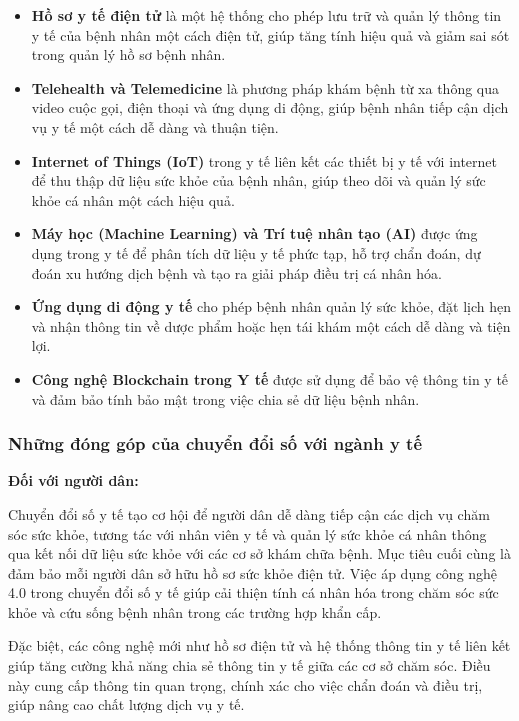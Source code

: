 \begin{itemize}
    \item \textbf{Hồ sơ y tế điện tử} là một hệ thống cho phép lưu trữ và quản lý thông tin y tế của bệnh nhân một cách điện tử, giúp tăng tính hiệu quả và giảm sai sót trong quản lý hồ sơ bệnh nhân.
    \item \textbf{Telehealth và Telemedicine} là phương pháp khám bệnh từ xa thông qua video cuộc gọi, điện thoại và ứng dụng di động, giúp bệnh nhân tiếp cận dịch vụ y tế một cách dễ dàng và thuận tiện.
    \item \textbf{Internet of Things (IoT)} trong y tế liên kết các thiết bị y tế với internet để thu thập dữ liệu sức khỏe của bệnh nhân, giúp theo dõi và quản lý sức khỏe cá nhân một cách hiệu quả.
    \item \textbf{Máy học (Machine Learning) và Trí tuệ nhân tạo (AI)} được ứng dụng trong y tế để phân tích dữ liệu y tế phức tạp, hỗ trợ chẩn đoán, dự đoán xu hướng dịch bệnh và tạo ra giải pháp điều trị cá nhân hóa.
    \item \textbf{Ứng dụng di động y tế} cho phép bệnh nhân quản lý sức khỏe, đặt lịch hẹn và nhận thông tin về dược phẩm hoặc hẹn tái khám một cách dễ dàng và tiện lợi.
    \item \textbf{Công nghệ Blockchain trong Y tế} được sử dụng để bảo vệ thông tin y tế và đảm bảo tính bảo mật trong việc chia sẻ dữ liệu bệnh nhân.
\end{itemize}

\subsubsection{Những đóng góp của chuyển đổi số với ngành y tế}
\textbf{Đối với người dân:}

Chuyển đổi số y tế tạo cơ hội để người dân dễ dàng tiếp cận các dịch vụ chăm sóc sức khỏe, tương tác với nhân viên y tế và quản lý sức khỏe cá nhân thông qua kết nối dữ liệu sức khỏe với các cơ sở khám chữa bệnh. Mục tiêu cuối cùng là đảm bảo mỗi người dân sở hữu hồ sơ sức khỏe điện tử. Việc áp dụng công nghệ 4.0 trong chuyển đổi số y tế giúp cải thiện tính cá nhân hóa trong chăm sóc sức khỏe và cứu sống bệnh nhân trong các trường hợp khẩn cấp.

Đặc biệt, các công nghệ mới như hồ sơ điện tử và hệ thống thông tin y tế liên kết giúp tăng cường khả năng chia sẻ thông tin y tế giữa các cơ sở chăm sóc. Điều này cung cấp thông tin quan trọng, chính xác cho việc chẩn đoán và điều trị, giúp nâng cao chất lượng dịch vụ y tế.

